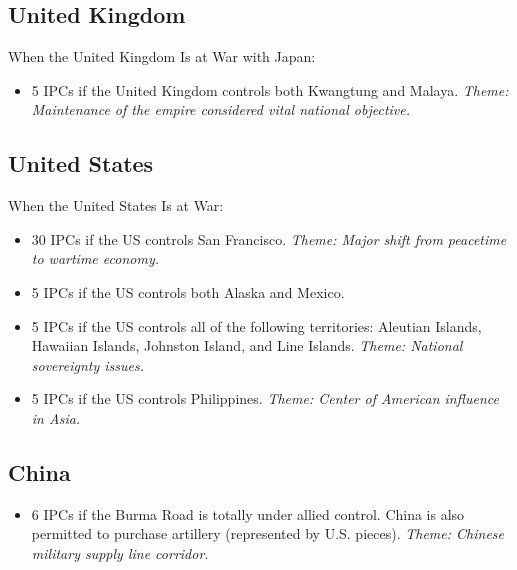 \documentclass[10pt,twoside]{article}
\begin{document}
\begin{multicols*}{3}
\subsection*{United Kingdom}
When the United Kingdom Is at War with Japan:
\begin{itemize}
\item 5 IPCs if the United Kingdom controls both Kwangtung
and Malaya. \textsl{Theme: Maintenance of the empire considered vital national objective.}
\end{itemize}

\subsection*{United States}
When the United States Is at War:
\begin{itemize}
\item 30 IPCs if the US controls San Francisco. \textsl{Theme: Major shift from peacetime to wartime economy.}
\item 5 IPCs if the US controls both Alaska and Mexico.
\item 5 IPCs if the US controls all of the following territories: Aleutian Islands, Hawaiian Islands, Johnston Island, and Line Islands. \textsl{Theme: National sovereignty issues.}
\item 5 IPCs if the US controls Philippines. \textsl{Theme: Center of American influence in Asia.}
\end{itemize}

\subsection*{China}
\begin{itemize}
\item 6 IPCs if the Burma Road is totally under allied control. China is also permitted to purchase artillery (represented by U.S. pieces). \textsl{Theme: Chinese military supply line corridor.}
\end{itemize}

\end{multicols*}
\end{document}
